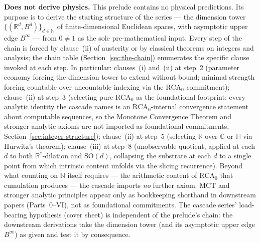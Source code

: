 \documentclass[11pt,a4paper]{article}
\begin{document}
\textbf{Does not derive physics.} This prelude contains no physical
predictions. Its purpose is to derive the starting structure of the
series --- the dimension tower
$\{(\mathbb{R}^d, B^d)\}_{d\in\mathbb{N}}$ of finite-dimensional
Euclidean spaces, with asymptotic upper edge $B^\infty$ --- from
$0\neq 1$ as the sole pre-mathematical input. Every step of the
chain is forced by clause~(ii) of austerity or by classical theorems
on integers and analysis; the chain table
(Section~\ref{sec:the-chain}) enumerates the specific clause invoked
at each step. In particular: clauses~(i) and~(ii) at step~2
(parameter economy forcing the dimension tower to extend without
bound; minimal strength forcing countable over uncountable indexing
via the $\mathrm{RCA}_0$ commitment); clause~(ii) at step~3
(selecting pure $\mathrm{RCA}_0$ as the foundational footprint:
every analytic identity the cascade names is an
$\mathrm{RCA}_0$-internal convergence statement about computable
sequences, so the Monotone Convergence Theorem and stronger
analytic axioms are not imported as foundational commitments,
Section~\ref{sec:integer-structure}); clause~(ii) at step~5
(selecting $\mathbb{R}$ over $\mathbb{C}$ or $\mathbb{H}$ via
Hurwitz's theorem); clause~(iii) at step~8 (unobservable quotient,
applied at each $d$ to both $\mathbb{R}^*$-dilation and
$\mathrm{SO}(d)$, collapsing the substrate at each $d$ to a single
point from which intrinsic content unfolds via the slicing
recurrence). Beyond what counting on $\mathbb{N}$ itself requires
--- the arithmetic content of $\mathrm{RCA}_0$ that cumulation
produces --- the cascade imports \emph{no} further axiom:
$\mathrm{MCT}$ and stronger analytic principles appear only as
bookkeeping shorthand in downstream papers (Parts~0--VI), not as
foundational commitments. The cascade series'
load-bearing hypothesis (cover sheet) is independent of the
prelude's chain: the downstream derivations take the dimension
tower (and its asymptotic upper edge $B^\infty$) as given and test
it by consequence.
\end{document}
